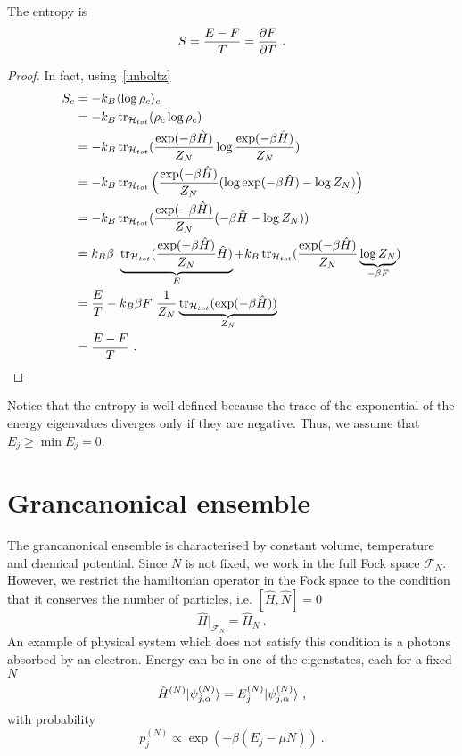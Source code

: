     The entropy is 
    \begin{equation*}
        S = \frac{E - F}{T} = \frac{\partial F}{\partial T} ~.
    \end{equation*}
    \begin{proof}
        In fact, using~\eqref{unboltz}
        \begin{equation*}
        \begin{aligned}
            S_c & = - k_B \langle\log \rho_c\rangle_c \\ & = - k_B \operatorname{tr}_{\mathcal H_{tot}} (\rho_c \log \rho_c) \\ & = - k_B \operatorname{tr}_{\mathcal H_{tot}} (\frac{\exp(- \beta \hat H)}{Z_N} \log \frac{\exp(- \beta \hat H)}{Z_N}) \\ & = - k_B \operatorname{tr}_{\mathcal H_{tot}} \Big (\frac{\exp(- \beta \hat H)}{Z_N} (\log \exp(- \beta \hat H) - \log Z_N) \Big ) \\ & = - k_B \operatorname{tr}_{\mathcal H_{tot}} (\frac{\exp(- \beta \hat H)}{Z_N} (- \beta \hat H - \log Z_N)) \\ & = k_B \beta ~ \underbrace{\operatorname{tr}_{\mathcal H_{tot}} (\frac{\exp(- \beta \hat H)}{Z_N} \hat H )}_E + k_B \operatorname{tr}_{\mathcal H_{tot}} (\frac{\exp(- \beta \hat H)}{Z_N} \underbrace{\log Z_N}_{- \beta F} ) \\ & = \frac{E}{T} - k_B \beta F ~ \frac{1}{Z_N} \underbrace{\operatorname{tr}_{\mathcal H_{tot}} (\exp(- \beta \hat H))}_{Z_N} \\ & = \frac{E-F}{T} ~.
        \end{aligned}
        \end{equation*}
    \end{proof}
    Notice that the entropy is well defined because the trace of the exponential of the energy eigenvalues diverges only if they are negative. Thus, we assume that $E_j \geq \min E_j = 0$.

\chapter{Grancanonical ensemble}

    The grancanonical ensemble is characterised by constant volume, temperature and chemical potential. Since $N$ is not fixed, we work in the full Fock space $\mathcal F_N$. However, we restrict the hamiltonian operator in the Fock space to the condition that it conserves the number of particles, i.e. $[\hat H, \hat N] = 0$ 
    \begin{equation*}
        \hat H \Big \vert_{\mathcal F_N} = \hat H_N ~.
    \end{equation*}
    An example of physical system which does not satisfy this condition is a photons absorbed by an electron. Energy can be in one of the eigenstates, each for a fixed $N$
    \begin{equation*}
        \hat H^{(N)} \vert\psi_{j, \alpha}^{(N)}\rangle = E_j^{(N)} \vert\psi_{j, \alpha}^{(N)}\rangle ~,
    \end{equation*}
    with probability 
    \begin{equation}\label{prob2}
        p_j^{(N)} \propto \exp(- \beta (E_j - \mu N)) ~.
    \end{equation}

